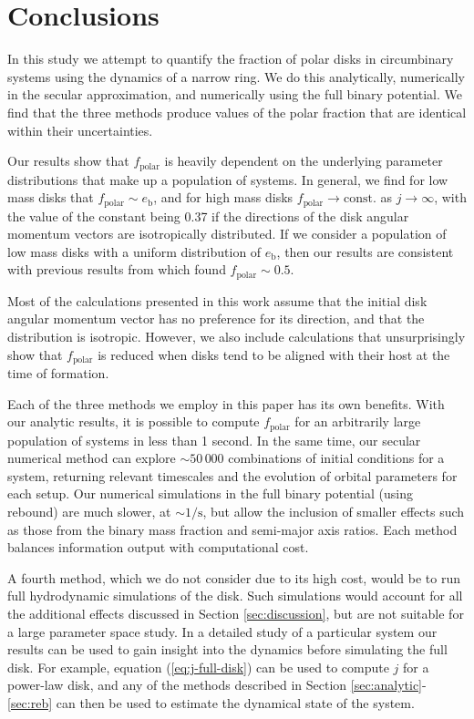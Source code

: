\documentclass[twocolumn,linenumbers]{aastex631}
\begin{document}
\section{Conclusions}
\label{sec:conclusions}

In this study we attempt to quantify the fraction of polar disks in circumbinary systems using the dynamics of a narrow ring. We do this analytically, numerically in the secular approximation, and numerically using the full binary potential. We find that the three methods produce values of the polar fraction that are identical within their uncertainties.

Our results show that $f_\text{polar}$ is heavily dependent on the underlying parameter distributions that make up a population of systems. In general, we find for low mass disks that $f_\text{polar} \sim e_\text{b}$, and for high mass disks $f_\text{polar} \rightarrow \text{const.}$ as $j\rightarrow \infty$, with the value of the constant being 0.37 if the directions of the disk angular momentum vectors are isotropically distributed.
If we consider a population of low mass disks with a uniform distribution of $e_\text{b}$, then our results are consistent with previous results from \citet{ceppi2024} which found $f_\text{polar}\sim 0.5$. 

Most of the calculations presented in this work assume that the initial disk angular momentum vector has no preference for its direction, and that the distribution is isotropic. However, we also include calculations that unsurprisingly show that $f_\text{polar}$ is reduced when disks tend to be aligned with their host at the time of formation.

Each of the three methods we employ in this paper has its own benefits. With our analytic results, it is possible to compute $f_\text{polar}$ for an arbitrarily large population of systems in less than 1 second. In the same time, our secular numerical method can explore $\sim 50\,000$ combinations of initial conditions for a system, returning relevant timescales and the evolution of orbital parameters for each setup. Our numerical simulations in the full binary potential (using {\sc rebound}) are much slower, at $\sim 1/\text{s}$, but allow the inclusion of smaller effects such as those from the binary mass fraction and semi-major axis ratios. Each method balances information output with computational cost.

A fourth method, which we do not consider due to its high cost, would be to run full hydrodynamic simulations of the disk. Such simulations would account for all the additional effects discussed in Section \ref{sec:discussion}, but are not suitable for a large parameter space study. In a detailed study of a particular system our results can be used to gain insight into the dynamics before simulating the full disk. For example, equation (\ref{eq:j-full-disk}) can be used to compute $j$ for a power-law disk, and any of the methods described in Section \ref{sec:analytic}-\ref{sec:reb} can then be used to estimate the dynamical state of the system.
\end{document}
